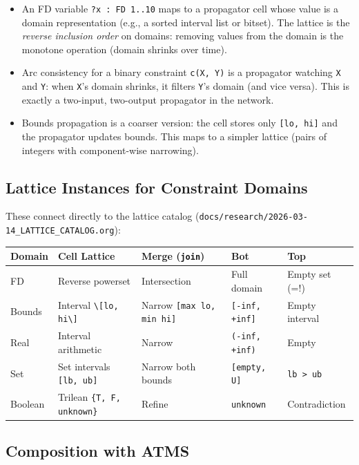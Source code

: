 \documentclass[11pt]{article}
\begin{document}
\begin{itemize}
\item An FD variable \texttt{?x : FD 1..10} maps to a propagator cell whose value is a
domain representation (e.g., a sorted interval list or bitset). The lattice
is the \emph{reverse inclusion order} on domains: removing values from the domain
is the monotone operation (domain shrinks over time).

\item Arc consistency for a binary constraint \texttt{c(X, Y)} is a propagator watching
\texttt{X} and \texttt{Y}: when \texttt{X}'s domain shrinks, it filters \texttt{Y}'s domain (and vice
versa). This is exactly a two-input, two-output propagator in the network.

\item Bounds propagation is a coarser version: the cell stores only \texttt{[lo, hi]} and
the propagator updates bounds. This maps to a simpler lattice (pairs of
integers with component-wise narrowing).
\end{itemize}
\subsection{Lattice Instances for Constraint Domains}
\label{sec:orgf6ec7e3}

These connect directly to the lattice catalog (\texttt{docs/research/2026-03-14\_LATTICE\_CATALOG.org}):

\begin{center}
\begin{tabular}{lllll}
Domain & Cell Lattice & Merge (\texttt{join}) & Bot & Top\\
\hline
FD & Reverse powerset & Intersection & Full domain & Empty set (=!)\\
Bounds & Interval \texttt{\textbackslash{}[lo, hi\textbackslash{}]} & Narrow \texttt{[max lo, min hi]} & \texttt{[-inf, +inf]} & Empty interval\\
Real & Interval arithmetic & Narrow & \texttt{(-inf, +inf)} & Empty\\
Set & Set intervals \texttt{[lb, ub]} & Narrow both bounds & \texttt{[empty, U]} & \texttt{lb > ub}\\
Boolean & Trilean \texttt{\{T, F, unknown\}} & Refine & \texttt{unknown} & Contradiction\\
\end{tabular}
\end{center}
\subsection{Composition with ATMS}
\label{sec:org76d9b68}
\end{document}
